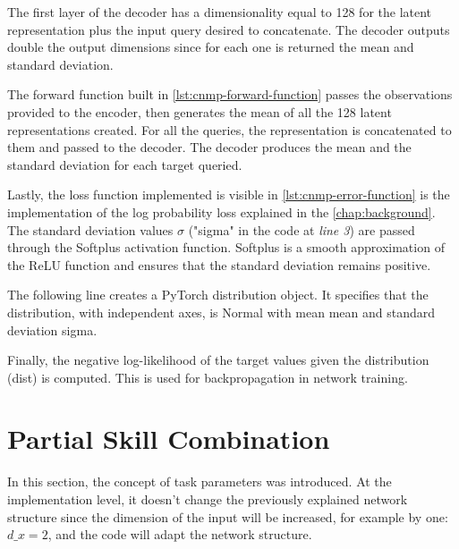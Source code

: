 The first layer of the decoder has a dimensionality equal to 128 for the latent representation plus the input query desired to concatenate. The decoder outputs double the output dimensions since for each one is returned the mean and standard deviation. 



The forward function built in \cref{lst:cnmp-forward-function} passes the observations provided to the encoder, then generates the mean of all the 128 latent representations created. For all the queries, the representation is concatenated to them and passed to the decoder. The decoder produces the mean and the standard deviation for each target queried. 



Lastly, the loss function implemented is visible in \cref{lst:cnmp-error-function} is the implementation of the log probability loss explained in the \cref{chap:background}. The standard deviation values $\sigma$ ("sigma" in the code at \emph{line 3}) are passed through the Softplus activation function. Softplus is a smooth approximation of the ReLU function and ensures that the standard deviation remains positive. 

The following line creates a PyTorch distribution object. It specifies that the distribution, with independent axes, is Normal with mean mean and standard deviation sigma. 

Finally, the negative log-likelihood of the target values given the distribution (dist) is computed. This is used for backpropagation in network training. 







\newpage
\section{Partial Skill Combination}
In this section, the concept of task parameters was introduced. At the implementation level, it doesn't change the previously explained network structure since the dimension of the input will be increased, for example by one: $d\_x = 2$, and the code will adapt the network structure.


